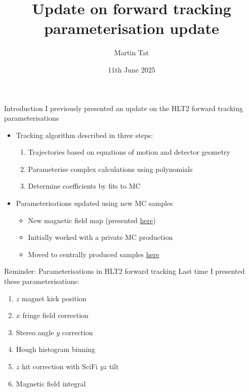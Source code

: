 \documentclass[xcolor={dvipsnames}]{beamer}
\title[Heidelberg tracking meeting]{Update on forward tracking parameterisation update}
\author[Martin Tat]{Martin Tat}
\institute[Heidelberg]{Heidelberg University}
\date{11th June 2025}
\begin{document}
\begin{frame}
  \titlepage
\end{frame}


\begin{frame}{Introduction}
  \vspace{0.0cm}
  {\Large I previously presented an update on the HLT2 forward tracking parameterisations}
  \vspace{0.5cm}
  \begin{itemize}
    \setlength\itemsep{1.0em}
    \item{Tracking algorithm described in three steps:}
    \begin{enumerate}
      \item{Trajectories based on equations of motion and detector geometry}
      \item{Parameterise complex calculations using polynomials}
      \item{Determine coefficients by fits to MC}
    \end{enumerate}
    \item{Parameterisations updated using new MC samples}
    \begin{itemize}
      \item{New magnetic field map (presented \href{https://indico.cern.ch/event/1539235/\#3-update-magnetic-field-map}{here})}
      \item{Initially worked with a private MC production}
      \item{Moved to centrally produced samples \href{https://gitlab.cern.ch/lhcb-simulation/mc-requests/-/merge_requests/1208}{here}}
    \end{itemize}
  \end{itemize}
\end{frame}

\begin{frame}{Reminder: Parameterisations in HLT2 forward tracking}
  \vspace{0.0cm}
  {\large Last time I presented these parameterisations:}
  \vspace{0.2cm}
  \begin{enumerate}
    \setlength\itemsep{0.5em}
    \item{$z$ magnet kick position}
    \item{$x$ fringe field correction}
    \item{Stereo angle $y$ correction}
    \item{Hough histogram binning}
    \item{$z$ hit correction with SciFi $yz$ tilt}
    \item{Magnetic field integral}
  \end{enumerate}
\end{frame}
\end{document}
